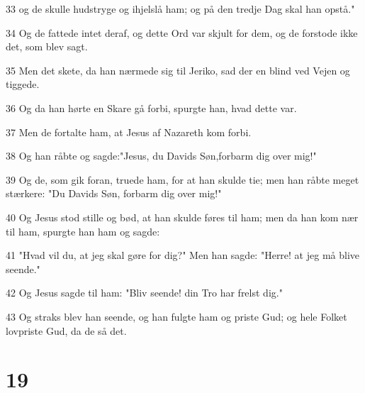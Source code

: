 \par 33 og de skulle hudstryge og ihjelslå ham; og på den tredje Dag skal han opstå."
\par 34 Og de fattede intet deraf, og dette Ord var skjult for dem, og de forstode ikke det, som blev sagt.
\par 35 Men det skete, da han nærmede sig til Jeriko, sad der en blind ved Vejen og tiggede.
\par 36 Og da han hørte en Skare gå forbi, spurgte han, hvad dette var.
\par 37 Men de fortalte ham, at Jesus af Nazareth kom forbi.
\par 38 Og han råbte og sagde:"Jesus, du Davids Søn,forbarm dig over mig!"
\par 39 Og de, som gik foran, truede ham, for at han skulde tie; men han råbte meget stærkere: "Du Davids Søn, forbarm dig over mig!"
\par 40 Og Jesus stod stille og bød, at han skulde føres til ham; men da han kom nær til ham, spurgte han ham og sagde:
\par 41 "Hvad vil du, at jeg skal gøre for dig?" Men han sagde: "Herre! at jeg må blive seende."
\par 42 Og Jesus sagde til ham: "Bliv seende! din Tro har frelst dig."
\par 43 Og straks blev han seende, og han fulgte ham og priste Gud; og hele Folket lovpriste Gud, da de så det.

\chapter{19}

